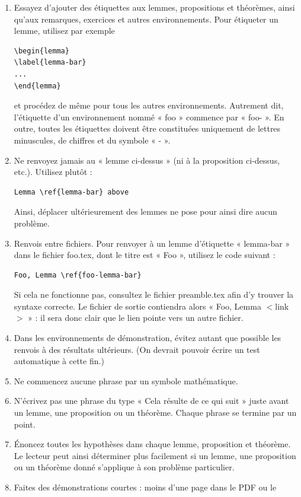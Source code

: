 \begin{enumerate}
\begin{verbatim}
\end{verbatim}
\item Essayez d'ajouter des étiquettes aux lemmes, propositions et théorèmes,
ainsi qu'aux remarques, exercices et autres environnements. Pour étiqueter un
lemme, utilisez par exemple
\begin{verbatim}
\begin{lemma}
\label{lemma-bar}
...
\end{lemma}
\end{verbatim}
et procédez de même pour tous les autres environnements. Autrement dit,
l'étiquette d'un environnement nommé « foo » commence par « foo- ».
En outre, toutes les étiquettes doivent être constituées uniquement de lettres
minuscules, de chiffres et du symbole « - ».
\item Ne renvoyez jamais au « lemme ci-dessus » (ni à la proposition
ci-dessus, etc.). Utilisez plutôt :
\begin{verbatim}
Lemma \ref{lemma-bar} above
\end{verbatim}
Ainsi, déplacer ultérieurement des lemmes ne pose pour ainsi dire aucun
problème.
\item Renvois entre fichiers. Pour renvoyer à un lemme d'étiquette
« lemma-bar » dans le fichier foo.tex, dont le titre est « Foo », utilisez le
code suivant :
\begin{verbatim}
Foo, Lemma \ref{foo-lemma-bar}
\end{verbatim}
Si cela ne fonctionne pas, consultez le fichier preamble.tex afin d'y trouver
la syntaxe correcte. Le fichier de sortie contiendra alors
« Foo, Lemma $<$link$>$ » : il sera donc clair que le lien pointe vers un autre
fichier.
\item Dans les environnements de démonstration, évitez autant que possible les
renvois à des résultats ultérieurs. (On devrait pouvoir écrire un test
automatique à cette fin.)
\item Ne commencez aucune phrase par un symbole mathématique.
\item N'écrivez pas une phrase du type « Cela résulte de ce qui suit » juste
avant un lemme, une proposition ou un théorème. Chaque phrase se termine par
un point.
\item Énoncez toutes les hypothèses dans chaque lemme, proposition et théorème.
Le lecteur peut ainsi déterminer plus facilement si un lemme, une proposition
ou un théorème donné s'applique à son problème particulier.
\item Faites des démonstrations courtes : moins d'une page dans le PDF ou le

\end{enumerate}
